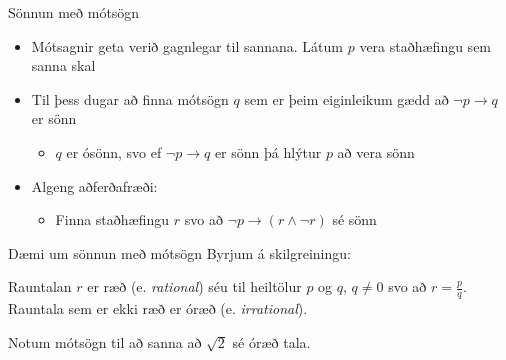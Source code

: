 \documentclass[handout]{beamer}
\begin{document}
\begin{frame}{Sönnun með mótsögn}
    \begin{itemize}
        \item Mótsagnir geta verið gagnlegar til sannana. Látum $p$ vera staðhæfingu sem sanna skal
        \item Til þess dugar að finna mótsögn $q$ sem er þeim eiginleikum gædd að $\lnot p \to q$ er sönn
        \begin{itemize}
            \item $q$ er ósönn, svo ef $\lnot p \to q$ er sönn þá hlýtur $p$ að vera sönn
        \end{itemize}
        \item Algeng aðferðafræði:
        \begin{itemize}
            \item Finna staðhæfingu $r$ svo að $\lnot p \to (r \land \lnot r)$ sé sönn
        \end{itemize}
    \end{itemize}
\end{frame}

\begin{frame}{Dæmi um sönnun með mótsögn}
    Byrjum á skilgreiningu:
    \begin{tcolorbox}[title=Ræðar og óræðar tölur]
        Rauntalan $r$ er ræð (e. \emph{rational}) séu til heiltölur $p$ og $q$, $q \neq 0$ svo að $r = \frac{p}{q}$. Rauntala sem er ekki ræð er óræð (e. \emph{irrational}).
    \end{tcolorbox}
    Notum mótsögn til að sanna að $\sqrt{2}$ sé óræð tala.
\end{frame}
\end{document}
